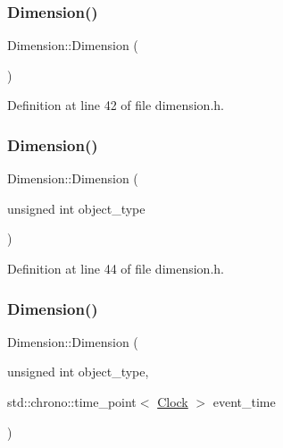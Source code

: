\subsubsection{\texorpdfstring{Dimension()}{Dimension()}\hspace{0.1cm}{\footnotesize\ttfamily [1/4]}}
{\footnotesize\ttfamily Dimension\+::\+Dimension (\begin{DoxyParamCaption}{ }\end{DoxyParamCaption})\hspace{0.3cm}{\ttfamily [inline]}}



Definition at line 42 of file dimension.\+h.

\mbox{\label{class_dimension_a68def81e037c1bcc005591f45c53e3a3}} 
\subsubsection{\texorpdfstring{Dimension()}{Dimension()}\hspace{0.1cm}{\footnotesize\ttfamily [2/4]}}
{\footnotesize\ttfamily Dimension\+::\+Dimension (\begin{DoxyParamCaption}\item[{unsigned int}]{object\+\_\+type }\end{DoxyParamCaption})\hspace{0.3cm}{\ttfamily [inline]}}



Definition at line 44 of file dimension.\+h.

\mbox{\label{class_dimension_ab48cbe6ca22404ab5a2c522498c38d7c}} 
\subsubsection{\texorpdfstring{Dimension()}{Dimension()}\hspace{0.1cm}{\footnotesize\ttfamily [3/4]}}
{\footnotesize\ttfamily Dimension\+::\+Dimension (\begin{DoxyParamCaption}\item[{unsigned int}]{object\+\_\+type,  }\item[{std\+::chrono\+::time\+\_\+point$<$ \hyperlink{universe_8h_a0ef8d951d1ca5ab3cfaf7ab4c7a6fd80}{Clock} $>$}]{event\+\_\+time }\end{DoxyParamCaption})\hspace{0.3cm}{\ttfamily [inline]}}



